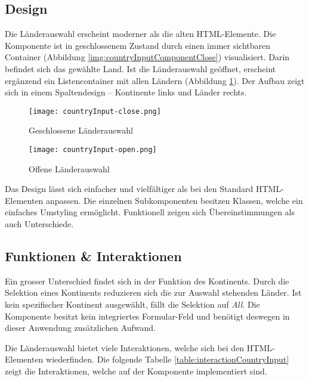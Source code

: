 \subsection{Design}
\label{sec:countryChoiceDesign}

Die Länderauswahl erscheint moderner als die alten HTML-Elemente. 
Die Komponente ist in geschlossenem Zustand durch einen immer sichtbaren Container (Abbildung \ref{img:countryInputComponentClose}) visualisiert. 
Darin befindet sich das gewählte Land. 
Ist die Länderauswahl geöffnet, erscheint ergänzend ein Listencontainer mit allen Ländern (Abbildung \ref{img:countryInputComponentOpen}). 
Der Aufbau zeigt sich in einem Spaltendesign – Kontinente links und Länder rechts. 

\begin{figure}[!htb]
    \centering
    \begin{minipage}[b]{0.5\textwidth}
        \centering
        \texttt{[image: countryInput-close.png]}
        \caption{\centering Geschlossene Länderauswahl}
        \label{img:countryInputComponentClose}
    \end{minipage}
    \hfill
    \begin{minipage}[b]{0.45\textwidth}
        \centering
        \texttt{[image: countryInput-open.png]}
        \caption{\centering Offene Länderauswahl}
        \label{img:countryInputComponentOpen}
    \end{minipage}
\end{figure}

Das Design lässt sich einfacher und vielfältiger als bei den Standard HTML-Elementen anpassen. 
Die einzelnen Subkomponenten besitzen Klassen, welche ein einfaches Umstyling ermöglicht. 
Funktionell zeigen sich Übereinstimmungen als auch Unterschiede. 


\subsection{Funktionen \& Interaktionen}
\label{sec:countryChoiceFunction}

Ein grosser Unterschied findet sich in der Funktion des Kontinents. 
Durch die Selektion eines Kontinents reduzieren sich die zur Auswahl stehenden Länder. 
Ist kein spezifischer Kontinent ausgewählt, fällt die Selektion auf \emph{All}. 
Die Komponente besitzt kein integriertes Formular-Feld und benötigt deswegen in dieser Anwendung zusätzlichen Aufwand. 

Die Länderauswahl bietet viele Interaktionen, welche sich bei den HTML-Elementen wiederfinden. 
Die folgende Tabelle \ref{table:interactionCountryInput} zeigt die Interaktionen, welche auf der Komponente implementiert sind. 


